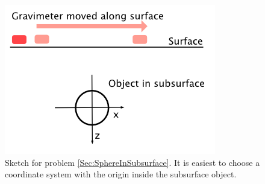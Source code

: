 \documentclass[a4paper,12pt]{article}
\begin{document}
\begin{figure}
\centering
\begin{minipage}[c]{0.5\textwidth}
\begin{center}
    \includegraphics[width=\textwidth]{Figures/Gravimetry/Gravimetry01_SphereSketch.png}
\end{center}
\caption{Sketch for problem \ref{Sec:SphereInSubsurface}. It is easiest to choose a coordinate system with the origin inside the subsurface object.}
\label{Fig:SphereInSubsurface}
\end{minipage}
\end{figure}
\end{document}

